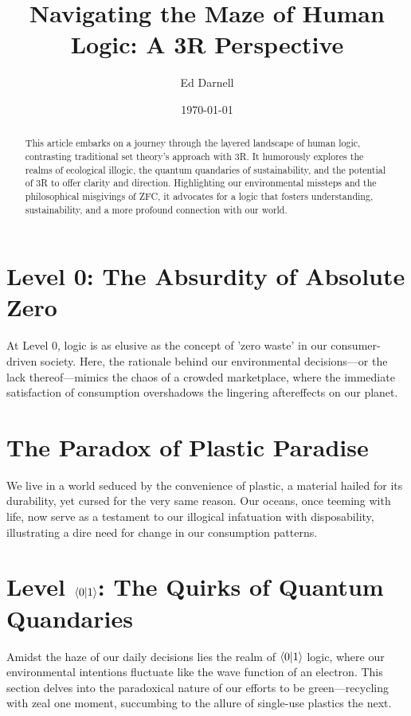 \documentclass[12pt]{article}
\title{Navigating the Maze of Human Logic: A 3R Perspective}
\author{Ed Darnell}
\date{\today}
\begin{document}
\maketitle

\begin{abstract}
    This article embarks on a journey through the layered landscape of human logic, contrasting traditional set theory's approach with 3R. It humorously explores the realms of ecological illogic, the quantum quandaries of sustainability, and the potential of 3R to offer clarity and direction. Highlighting our environmental missteps and the philosophical misgivings of ZFC, it advocates for a logic that fosters understanding, sustainability, and a more profound connection with our world.
\end{abstract}

\section*{Level 0: The Absurdity of Absolute Zero}

At Level 0, logic is as elusive as the concept of 'zero waste' in our consumer-driven society. Here, the rationale behind our environmental decisions—or the lack thereof—mimics the chaos of a crowded marketplace, where the immediate satisfaction of consumption overshadows the lingering aftereffects on our planet.

\section*{The Paradox of Plastic Paradise}

We live in a world seduced by the convenience of plastic, a material hailed for its durability, yet cursed for the very same reason. Our oceans, once teeming with life, now serve as a testament to our illogical infatuation with disposability, illustrating a dire need for change in our consumption patterns.

\section*{Level \(\langle 0 | 1 \rangle\): The Quirks of Quantum Quandaries}

Amidst the haze of our daily decisions lies the realm of \(\langle 0 | 1 \rangle\) logic, where our environmental intentions fluctuate like the wave function of an electron. This section delves into the paradoxical nature of our efforts to be green—recycling with zeal one moment, succumbing to the allure of single-use plastics the next.
\end{document}
